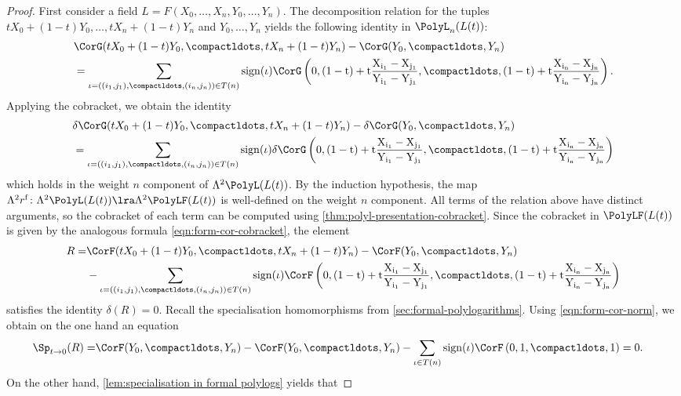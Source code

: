 \documentclass[a4paper]{amsart}
\begin{document}
\begin{proof}
First consider a field $L=F(X_0,\dots,X_n,Y_0,\dots,Y_n)$.
The decomposition relation for the tuples $tX_0+(1-t)Y_0,\dots, tX_n+(1-t)Y_n$ and  $Y_0,\dots, Y_n$ yields the following identity in $\PolyL_n(L(t))$:
\begin{align*}
  &\CorG(tX_0+(1-t)Y_0,\compactldots,tX_n+(1-t)Y_n)-\CorG(Y_0,\compactldots,Y_n)\\
     &=\sum_{\iota=((i_1,j_1),\compactldots,(i_{n},j_n))\in T(n)}\rm{sign}(\iota)
     \CorG\left(0,(1-t)+t\frac{X_{i_1}-X_{j_1}}{Y_{i_1}-Y_{j_1}},\compactldots,(1-t)+t\frac{X_{i_n}-X_{j_n}}{Y_{i_n}-Y_{j_n}}\right).
\end{align*}
Applying the cobracket, we obtain the identity 
\begin{align*}
  &\delta\CorG(tX_0+(1-t)Y_0,\compactldots,tX_n+(1-t)Y_n)-\delta\CorG(Y_0,\compactldots,Y_n)\\
     &=\sum_{\iota=((i_1,j_1),\compactldots,(i_{n},j_n))\in T(n)}\rm{sign}(\iota)
     \delta\CorG\left(0,(1-t)+t\frac{X_{i_1}-X_{j_1}}{Y_{i_1}-Y_{j_1}},\compactldots,(1-t)+t\frac{X_{i_n}-X_{j_n}}{Y_{i_n}-Y_{j_n}}\right)
\end{align*}
which holds in the weight $n$ component of $\Lambda^2 \PolyL(L(t))$. By the induction hypothesis, the map
$\Lambda^2r^{\mathrm{f}}\colon \Lambda^2 \PolyL(L(t)) \lra \Lambda^2 \PolyLF(L(t))$ is well-defined on the weight $n$ component. All terms of the relation above have distinct arguments, so the cobracket of each term can be computed using \cref{thm:polyl-presentation-cobracket}. Since the cobracket in $\PolyLF(L(t))$ is given by the analogous formula \eqref{eqn:form-cor-cobracket},  the element 
\begin{align*}
R=&\CorF(tX_0+(1-t)Y_0,\compactldots,tX_n+(1-t)Y_n)-\CorF(Y_0,\compactldots,Y_n)\\
     &-\sum_{\iota=((i_1,j_1),\compactldots,(i_{n},j_n))\in T(n)}\rm{sign}(\iota)
   \CorF\left(0,(1-t)+t\frac{X_{i_1}-X_{j_1}}{Y_{i_1}-Y_{j_1}},\compactldots,(1-t)+t\frac{X_{i_n}-X_{j_n}}{Y_{i_n}-Y_{j_n}}\right)
\end{align*}
satisfies the identity $\delta(R)=0$. Recall the specialisation homomorphisms from \cref{sec:formal-polylogarithms}. Using \eqref{eqn:form-cor-norm}, we obtain on the one hand an equation
\begin{align*}
\Sp_{t\to 0}(R)= &\CorF(Y_0,\compactldots,Y_n)-\CorF(Y_0,\compactldots,Y_n)-\sum_{\iota\in T(n)}\rm{sign}(\iota)
   \CorF\left(0,1,\compactldots,1\right)=0.
\end{align*}
On the other hand, \cref{lem:specialisation in formal polylogs} yields that 

\end{proof}
\end{document}

